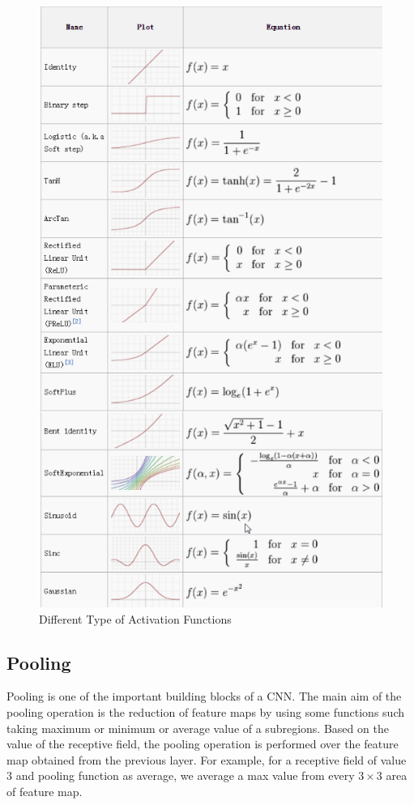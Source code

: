 \begin{figure}[H]
  \centering
    \includegraphics[scale=.5, angle=0]{Files/activation-function.png}
    \caption[Different Type of Activation Functions]{Different Type of Activation Functions \cite{activation}}
    \label{fig:activation}
\end{figure}

\subsection{Pooling}
Pooling is one of the important building blocks of a CNN. The main aim of the pooling operation is the reduction of feature maps by using some functions such taking maximum or minimum or average value of a subregions. Based on the value of the receptive field, the pooling operation is performed over the feature map obtained from the previous layer. For example, for a receptive field of value 3 and pooling function as average, we average a max value from every $3 \times 3$ area of feature map.

